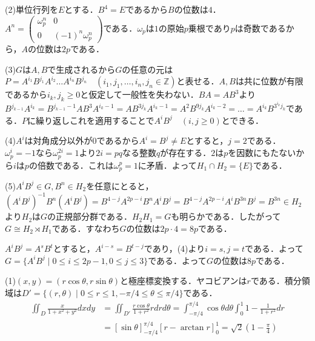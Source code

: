 \documentclass[
		book,
		head_space=20mm,
		foot_space=20mm,
		gutter=10mm,
		line_length=190mm
]{jlreq}
\begin{document}
(2)単位行列を$E$とする．$B^4=E$であるから$B$の位数は$4$．
$A^n=\begin{pmatrix}
	\omega_p^n & 0\\
	0 & (-1)^n\omega_p^n
\end{pmatrix}$である．$\omega_p$は$1$の原始$p$乗根であり$p$は奇数であるから，$A$の位数は$2p$である．

(3)$G$は$A,B$で生成されるから$G$の任意の元は$P=A^{i_1}B^{j_1}A^{i_2}\dots A^{i_n}B^{j_n}\quad(i_1,j_1,\dots,i_n,j_n\in \mathbb{Z})$と表せる．$A,B$は共に位数が有限であるから$i_k,j_k \ge 0$と仮定して一般性を失わない．$BA=AB^3$より
$B^{j_{k-1}}A^{i_k}=B^{j_{k-1}-1}AB^3A^{i_k-1}=AB^{3j_k}A^{i_k-1}=A^2B^{9j_k}A^{i_k-2}=\dots=A^{i_k}B^{3^{i_k}j_k}$である．$P$に繰り返しこれを適用することで$A^iB^j\quad(i,j\ge0)$とできる．

(4)$A^i$は対角成分以外が$0$であるから$A^i=B^j\neq E$とすると，$j=2$である．$\omega_p^i=-1$なら$\omega_p^{2i}=1$より$2i=pq$なる整数$q$が存在する．$2$は$p$を因数にもたないから$i$は$p$の倍数である．これは$\omega_p^p=1$に矛盾．よって$H_1\cap H_2=\{ E\}$である．

(5)$A^iB^j\in G,B^n\in H_2$を任意にとると，
$(A^iB^j)^{-1}B^n (A^iB^j)=B^{4-j}A^{2p-i}B^nA^iB^j=B^{4-j}A^{2p-i}A^iB^{3n}B^j=B^{3n}\in H_2$より$H_2$は$G$の正規部分群である．$H_2H_1=G$も明らかである．したがって$G \cong H_2 \rtimes H_1$である．すなわち$G$の位数は$2p\cdot 4=8p$である．

\begin{tcolorbox}[blanker,breakable,
	left=3mm,right=3mm,
	top=3mm,bottom=3mm,
	before skip=15pt,after skip=15pt,
	borderline vertical={1pt}{0pt}{black,dotted}]
	$A^iB^j=A^sB^t$とすると，$A^{i-s}=B^{t-j}$であり，(4)より$i=s,j=t$である．よって$G=\{ A^iB^j \mid 0\le i \le 2p-1,0\le j \le 3\}$である．よって$G$の位数は$8p$である．
	\end{tcolorbox}

(1)$(x,y)=(r\cos \theta,r\sin \theta)$と極座標変換する．ヤコビアンは$r$である．積分領域は$D'=\{ (r,\theta) \mid 0\le r \le 1,-\pi/4 \le \theta \le \pi/4\}$である．
\begin{align}
	\iint_D \frac{x}{1+x^2+y^2}dxdy&=\iint_{D'} \frac{r\cos \theta}{1+r^2}rdrd\theta=\int_{-\pi/4}^{\pi/4}\cos \theta d\theta \int_0^1 1-\frac{1}{1+r^2}dr\\
	&=[\sin \theta]_{-\pi/4}^{\pi/4}[r-\arctan r]_0^1=\sqrt{2}(1-\frac{\pi}{4})
\end{align}
\end{document}
